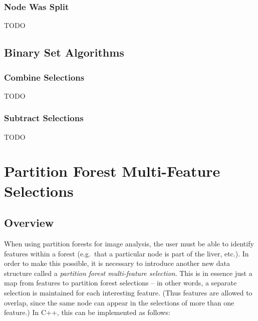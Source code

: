 \afterpage{\clearpage}
\newpage

\subsubsection{Node Was Split}

TODO

\subsection{Binary Set Algorithms}

\subsubsection{Combine Selections}

TODO

\subsubsection{Subtract Selections}

TODO

\newpage

\section{Partition Forest Multi-Feature Selections}

\subsection{Overview}

When using partition forests for image analysis, the user must be able to identify features within a forest (e.g.~that a particular node is part of the liver, etc.). In order to make this possible, it is necessary to introduce another new data structure called a \emph{partition forest multi-feature selection}. This is in essence just a map from features to partition forest selections -- in other words, a separate selection is maintained for each interesting feature. (Thus features are allowed to overlap, since the same node can appear in the selections of more than one feature.) In C++, this can be implemented as follows:

